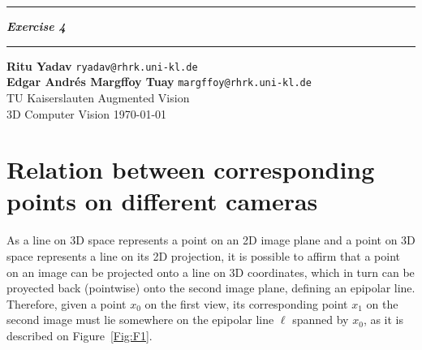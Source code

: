 \documentclass{article}
\newcommand{\squishlist}{
 \begin{list}{$\bullet$}
  { \setlength{\itemsep}{0pt}
     \setlength{\parsep}{3pt}
     \setlength{\topsep}{3pt}
     \setlength{\partopsep}{0pt}
     \setlength{\leftmargin}{1.5em}
     \setlength{\labelwidth}{1em}
     \setlength{\labelsep}{0.5em} } }
\newcommand{\squishend}{
  \end{list}  }
\begin{document}
 \def\maketitle{%
 \thispagestyle{plain}
 \vspace{-10ex}
 \hrule
 \bigskip
 \begin{center}
 {\Large{\textbf{\@title}}}
 \end{center}
 \bigskip
 \hrule

 \bigskip

 \begin{flushleft}
 \textbf{\normalsize{Ritu Yadav}} \hfill \texttt{ryadav@rhrk.uni-kl.de}
 \\
 \vspace{5pt}
 \textbf{\normalsize{Edgar Andr\'{e}s Margffoy Tuay}} \hfill \texttt{margffoy@rhrk.uni-kl.de}
 \\
 \vspace{5pt}
 TU Kaiserslauten \hfill Augmented Vision
 \\
 \vspace{5pt}
 3D Computer Vision \vspace{5pt}
\hfill \today \\ 
 \end{flushleft}
 }
\def\title#1{\def\@title{#1}}
\title{\textit{Exercise 4}}



\maketitle

\section{Relation between corresponding points on different cameras}
As a line on 3D space represents a point on an 2D image plane and a point on 3D space represents a line on its 2D projection, it is possible to affirm that a point on an image can be projected onto a line on 3D coordinates, which in turn can be proyected back (pointwise) onto the second image plane, defining an epipolar line. Therefore, given a point $x_0$ on the first view, its corresponding point $x_1$ on the second image must lie somewhere on the epipolar line $\ell$ spanned by $x_0$, as it is described on Figure~\ref{Fig:F1}.
\end{document}

